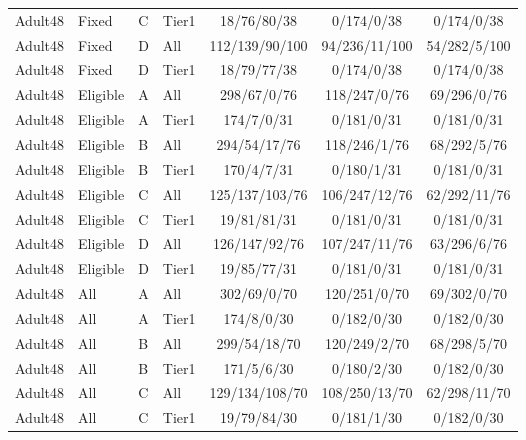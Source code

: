 \begin{longtable}{llllccc}
Adult48 & Fixed & C & Tier1 & 18/76/80/38 & 0/174/0/38 & 0/174/0/38 \\

Adult48 & Fixed & D & All & 112/139/90/100 & 94/236/11/100 & 54/282/5/100 \\

Adult48 & Fixed & D & Tier1 & 18/79/77/38 & 0/174/0/38 & 0/174/0/38 \\

Adult48 & Eligible & A & All & 298/67/0/76 & 118/247/0/76 & 69/296/0/76 \\

Adult48 & Eligible & A & Tier1 & 174/7/0/31 & 0/181/0/31 & 0/181/0/31 \\

Adult48 & Eligible & B & All & 294/54/17/76 & 118/246/1/76 & 68/292/5/76 \\

Adult48 & Eligible & B & Tier1 & 170/4/7/31 & 0/180/1/31 & 0/181/0/31 \\

Adult48 & Eligible & C & All & 125/137/103/76 & 106/247/12/76 & 62/292/11/76 \\

Adult48 & Eligible & C & Tier1 & 19/81/81/31 & 0/181/0/31 & 0/181/0/31 \\

Adult48 & Eligible & D & All & 126/147/92/76 & 107/247/11/76 & 63/296/6/76 \\

Adult48 & Eligible & D & Tier1 & 19/85/77/31 & 0/181/0/31 & 0/181/0/31 \\

Adult48 & All & A & All & 302/69/0/70 & 120/251/0/70 & 69/302/0/70 \\

Adult48 & All & A & Tier1 & 174/8/0/30 & 0/182/0/30 & 0/182/0/30 \\

Adult48 & All & B & All & 299/54/18/70 & 120/249/2/70 & 68/298/5/70 \\

Adult48 & All & B & Tier1 & 171/5/6/30 & 0/180/2/30 & 0/182/0/30 \\

Adult48 & All & C & All & 129/134/108/70 & 108/250/13/70 & 62/298/11/70 \\

Adult48 & All & C & Tier1 & 19/79/84/30 & 0/181/1/30 & 0/182/0/30 \\


\end{longtable}
